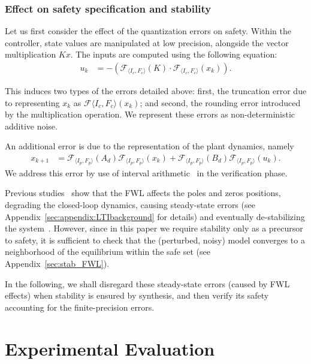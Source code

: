 \documentclass[twocolumn]{autart}    %
\begin{document}
\subsubsection{Effect on safety specification and stability}

Let us first consider the effect of the quantization errors on safety. 
Within the controller, state values are manipulated at low precision,
alongside the vector multiplication $Kx$.
The inputs are computed using the following equation: 
%
\begin{align*}
u_{k}&=-(\mathcal{F}_{\langle I_c,F_c \rangle}(K)\cdot\mathcal{F}_{\langle I_c,F_c \rangle}(x_{k})). 
\end{align*}

This induces two types of the errors detailed above: first, the truncation
error due to representing $x_k$ as $\mathcal{F}{\langle I_c,F_c
\rangle}(x_{k})$; and second, the rounding error introduced by the
multiplication operation.  We represent these errors as non-deterministic
additive noise.

An additional error is due to the representation of the plant dynamics, namely 
%
\begin{align*}
x_{k+1} &=\mathcal{F}_{\langle I_p,F_p \rangle}(A_d) \mathcal{F}_{\langle I_p,F_p \rangle}(x_{k}) + \mathcal{F}_{\langle I_p,F_p \rangle}(B_d)\mathcal{F}_{\langle I_p,F_p \rangle}(u_{k}).
\end{align*}
We address this error by use of interval
arithmetic~\cite{moore1966interval} in the verification phase.

Previous studies~\cite{gangli1} show that the FWL affects the poles and
zeros positions, degrading the closed-loop dynamics, causing steady-state
errors (see Appendix~\ref{sec:appendix:LTIbackground} for details) and
eventually de-stabilizing the system~\cite{Bessa16}.  However, since in this
paper we require stability only as a precursor to safety, it is sufficient
to check that the (perturbed, noisy) model converges to a neighborhood of
the equilibrium within the safe set (see Appendix~\ref{sec:stab_FWL}).

In the following, we shall disregard these steady-state errors (caused by
FWL effects) when stability is ensured by synthesis, and then verify its
safety accounting for the finite-precision errors.


\section{Experimental Evaluation}
\label{exp:evaluation}
\end{document}
